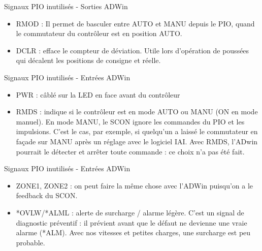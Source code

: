 \documentclass[a4paper,11pt]{beamer}
\begin{document}
\begin{frame}
	\begin{block}{Signaux PIO inutilisés - Sorties ADWin}
	\begin{itemize}
\justifying
		\item RMOD : Il permet de basculer entre AUTO et MANU depuis le PIO, quand le commutateur du contrôleur est en position AUTO.
		\item DCLR : efface le compteur de déviation. Utile lors d'opération de poussées qui décalent les positions de consigne et réelle.
	\end{itemize}
	\end{block}
	\begin{block}{Signaux PIO inutilisés - Entrées ADWin}
	\begin{itemize}
	\justifying
		\item PWR : câblé sur la LED en face avant du contrôleur
		\item RMDS : indique si le contrôleur est en mode AUTO ou MANU (ON en mode manuel). En mode MANU, le SCON ignore les commandes du PIO et les impulsions. C'est le cas, par exemple, si quelqu'un a laissé le commutateur en façade sur MANU après un réglage avec le logiciel IAI. Avec RMDS, l'ADwin pourrait le détecter et arrêter toute commande : ce choix n'a pas été fait.
	\end{itemize}
	\end{block}
\end{frame}
\begin{frame}
\begin{block}{Signaux PIO inutilisés - Entrées ADWin}

\justifying
	\begin{itemize}
	\justifying
		\item ZONE1, ZONE2 : on peut faire la même chose avec l'ADWin puisqu'on a le feedback du SCON.
		\item *OVLW/*ALML : alerte de surcharge / alarme légère. C'est un signal de diagnostic préventif : il prévient avant que le défaut ne devienne une vraie alarme (*ALM). Avec nos vitesses et petites charges, une surcharge est peu probable.
	\end{itemize}
	\end{block}
\end{frame}
\end{document}
